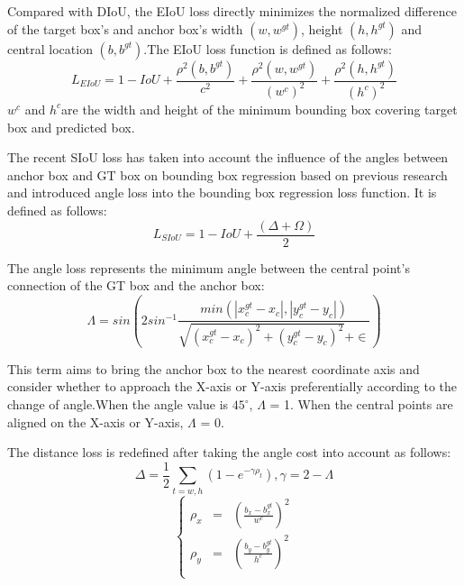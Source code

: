 \documentclass[lettersize,journal]{IEEEtran}
\begin{document}
	\par Compared with DIoU, the EIoU loss\cite{ref4} directly minimizes the normalized difference of the target box's and anchor box's width $(w,w^{gt})$, height $(h,h^{gt})$ and central location $(b,b^{gt})$.The EIoU loss function\cite{ref4} is defined as follows:
	\begin{equation}
		L_{EIoU}=1-IoU+\displaystyle\frac{\rho^{2}(b,b^{gt})}{c^{2}}+\displaystyle\frac{\rho^{2}(w,w^{gt})}{(w^{c})^{2}}+\displaystyle\frac{\rho^{2}(h,h^{gt})}{(h^{c})^{2}}
	\end{equation}
	 $w^{c}$ and $h^{c}$are the width and height of the minimum bounding box covering target box and predicted box. 
	\par The recent SIoU loss\cite{ref5} has taken into account the influence of the angles between anchor box and GT box on bounding box regression based on previous research and introduced angle loss into the bounding box regression loss function. It is defined as follows:
\begin{equation}
		L_{SIoU}=1-IoU+\displaystyle\frac{(\Delta+\Omega)}{2}
	\end{equation}
	\par The angle loss represents the minimum angle between the central point's connection of the GT box and the anchor box:
	\begin{equation}
		\Lambda=sin(2sin^{-1}\displaystyle\frac{min(\left\vert x_{c}^{gt}-x_{c} \right\vert,\left\vert y_{c}^{gt}-y_{c} \right\vert)}{\sqrt{ (x_{c}^{gt}-x_{c})^{2}+(y_{c}^{gt}-y_{c})^{2}}+\in})
	\end{equation}
	\par This term aims to bring the anchor box to the nearest coordinate axis and consider whether to approach the X-axis or Y-axis preferentially according to the change of angle.When the angle value is $45^{\circ}$, $\Lambda$ = 1. When the central points are aligned on the X-axis or Y-axis, $\Lambda$ = 0. 
	\par The distance loss is redefined after taking the angle cost into account as follows: 
	\begin{equation}
		\Delta=\frac{1}{2}\sum_{t=w,h}(1-e^{-\gamma\rho_{t}}),\gamma=2-\Lambda
	\end{equation}
	\begin{equation}
		\left\{
		\begin{aligned}
			\displaystyle\rho_{x} & = & (\frac{b_{x}-b_{x}^{gt}}{w^{c}})^{2} \\
			\rho_{y} & = & (\frac{b_{y}-b_{y}^{gt}}{h^{c}})^{2} \\
		\end{aligned}
		\right.
	\end{equation}
\end{document}
